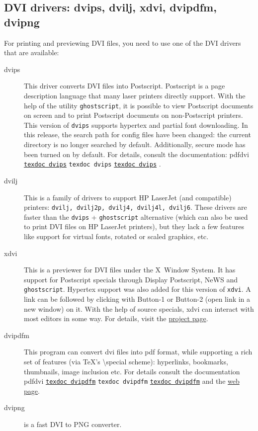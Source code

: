 \documentclass[11pt,a4paper]{article}
\newcommand{\pdfext}{pdf}
\newcommand{\dviext}{dvi}
\let\docext=\pdfext
\let\docext=\dviext
\newcommand{\dlink}[3]{%
  \ifpdf
    \ifx\pdfext#3
      \href{#1/#2.#3}{\texttt{texdoc #2}}%
    \else
      \texttt{texdoc #2}%
    \fi
  \else
     \href{#1/#2.#3}{\mbox{\texttt{texdoc #2}}}%
  \fi}
\begin{document}
\subsection{DVI drivers: dvips, dvilj, xdvi, dvipdfm, dvipng}
For printing and previewing DVI files, you need to use one of the DVI
drivers that are available:
\begin{description}
\item [dvips] This driver converts DVI files into Postscript.
  Postscript is a page description language that many laser printers
  directly support. With the help of the utility \texttt{ghostscript},
  it is possible to view Postscript documents on screen and to print
  Postscript documents on non-Postscript printers. This version of
  \texttt{dvips} supports hypertex and partial font downloading.  In
  this release, the search path for config files have been changed:
  the current directory is no longer searched by default.
  Additionally, secure mode has been turned on by default. For
  details, consult the documentation:
  \dlink{../../../texmf-dist/doc/programs}{dvips}{\dviext}.
\item [dvilj] This is a family of drivers to support HP LaserJet (and
  compatible) printers: \texttt{dvilj, dvilj2p, dvilj4, dvilj4l,
    dvilj6}. These drivers are faster than the \texttt{dvips} +
  \texttt{ghostscript} alternative (which can also be used to print
  DVI files on HP LaserJet printers), but they lack a few features
  like support for virtual fonts, rotated or scaled graphics, etc.
\item [xdvi] This is a previewer for DVI files under the X~Window
  System. It has support for Postscript specials through Display
  Postscript, NeWS and \texttt{ghostscript}. Hypertex support was also
  added for this version of \texttt{xdvi}. A link can be followed by
  clicking with Button-1 or Button-2 (open link in a new window) on
  it. With the help of source specials, xdvi can interact with most
  editors in some way. For details, visit the
  \href{http://xdvi.sourceforge.net/inverse-search.html}{project
    page}.
\item [dvipdfm] This program can convert dvi files into pdf format,
  while supporting a rich set of features (via TeX's
  \textbackslash special scheme): hyperlinks, bookmarks, thumbnails,
  image inclusion etc. For details consult the documentation
  \dlink{../../../texmf-dist/doc/programs}{dvipdfm}{\docext} and the
  \href{http://gaspra.kettering.edu/dvipdfm/}{web page}.
\item [dvipng] is a fast DVI to PNG converter.
\end{description}
\end{document}
